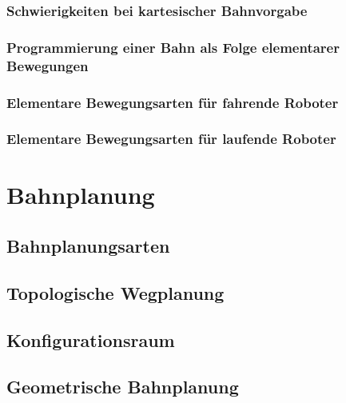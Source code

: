 \documentclass[a4paper, 11pt, accentcolor = tud3b]{tudreport}
\begin{document}
			\subsection{Schwierigkeiten bei kartesischer Bahnvorgabe} %

			\subsection{Programmierung einer Bahn als Folge elementarer Bewegungen} %

			\subsection{Elementare Bewegungsarten für fahrende Roboter} %

			\subsection{Elementare Bewegungsarten für laufende Roboter} %

	\chapter{Bahnplanung} %

		\section{Bahnplanungsarten} %

		\section{Topologische Wegplanung} %

		\section{Konfigurationsraum} %

		\section{Geometrische Bahnplanung} %
\end{document}
